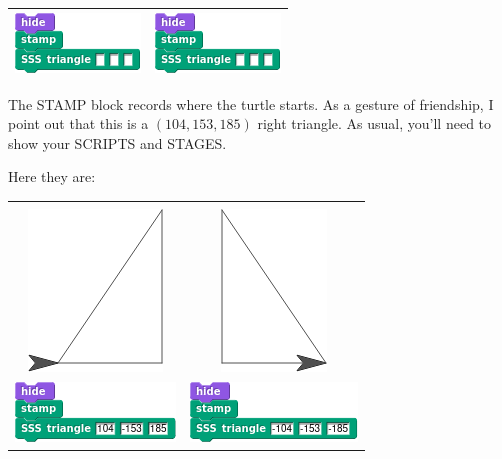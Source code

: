 \documentclass[noauthor,nooutcomes,12pt,hints]{ximera}
\begin{document}
\begin{question}
\begin{center}
\begin{tabular}{|c||c|}
      \includegraphics{SSSstampBlank.png} & \includegraphics{SSSstampBlank.png} \\\hline
    \end{tabular}
  \end{center}
  The STAMP block records where the turtle starts. As a gesture of
  friendship, I point out that this is a $(104, 153, 185)$ right
  triangle. As usual, you'll need to show your SCRIPTS and STAGES.
  \begin{freeResponse}
    Here they are:
    \begin{center}
    \begin{tabular}{|c||c|}\hline
      &  \\
      \includegraphics{SSSstampStageII.png} & \includegraphics{SSSstampStageI.png} \\
      \includegraphics{SSSstampScriptII.png} & \includegraphics{SSSstampScriptI.png} \\

\end{tabular}
\end{center}
\end{freeResponse}
\end{question}
\end{document}
